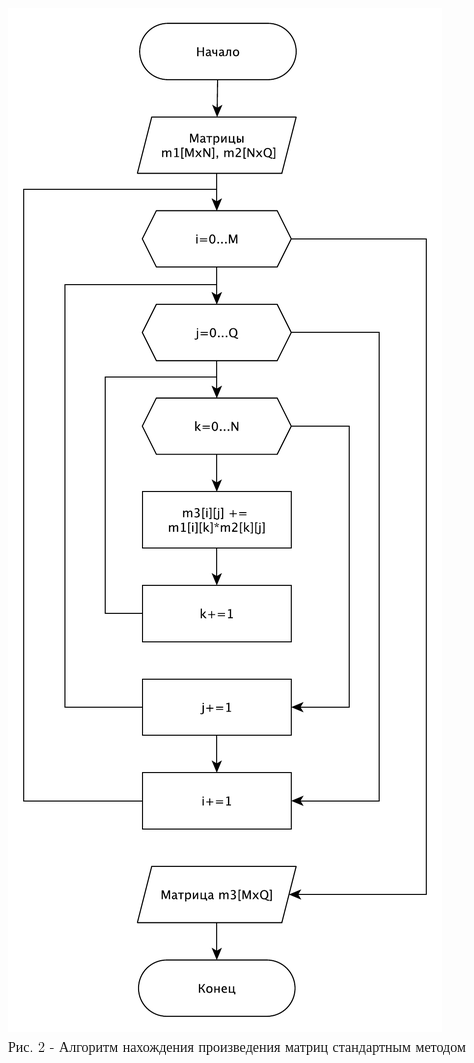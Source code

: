 \documentclass[a4paper,14pt]{article} %
\begin{document}
        \begin{center}
        		\includegraphics[scale = 0.65]{shema1} \\ Рис. 2 - Алгоритм нахождения произведения матриц стандартным методом
	\end{center}
	
\end{document}
